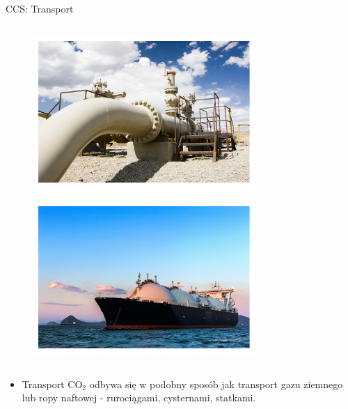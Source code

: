\begin{columnframe}{CCS: Transport}
    \begin{column}{0.5\textwidth}
        \begin{figure}
            \centering
            \includegraphics[width=0.75\textwidth, frame]{images/co2_transport.png}
        \end{figure}
    \end{column}
    \begin{column}{0.5\textwidth}
        \begin{itemize}
            \item Transport CO$_2$
                  odbywa się w podobny sposób jak transport gazu ziemnego lub ropy naftowej - rurociągami, cysternami, statkami.
        \end{itemize}
    \end{column}
\end{columnframe}

